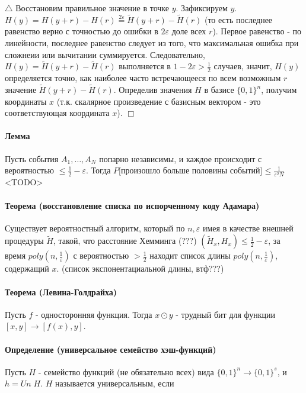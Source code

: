 \documentclass[12pt, a4paper]{article}
\newcommand{\uniform}{Un \;}
\newcommand{\bool}{\{0, 1\}}
\newcommand{\eps}{\varepsilon}
\begin{document}
$\triangle$ Восстановим правильное значение в точке $y$. Зафиксируем $y$. $H(y) = H(y + r) - H(r) \stackrel{2 \eps}{=} \widetilde{H}(y + r) - \widetilde{H}(r)$ (то есть последнее равенство верно с точностью до ошибки в $2 \eps$ доле всех $r$). Первое равенство - по линейности, последнее равенство следует из того, что максимальная ошибка при сложнеии или вычитании суммируется. Следовательно, $H(y) = \widetilde{H}(y + r) - \widetilde{H}(r)$ выполняется в $1 - 2\eps > \frac{1}{2}$ случаев, значит, $H(y)$ определяется точно, как наиболее часто встречающееся по всем возможным $r$ значение $\widetilde{H}(y + r) - \widetilde{H}(r)$. Определив значения $H$ в базисе $\bool^n$, получим координаты $x$ (т.к. скалярное произведение с базисным вектором - это соответствующая координата $x$).
$\Box$

\paragraph{Лемма} Пусть события $A_1, \dots, A_N$ попарно независимы, и каждое происходит с вероятностью $\leq \frac{1}{2} - \eps$. Тогда $P[$произошло больше половины событий$] \leq \frac{1}{\eps^2 N}$
<TODO>

\paragraph{Теорема (восстановление списка по испорченному коду Адамара)} Существует вероятностный алгоритм, который по $n, \eps$ имея в качестве внешней процедуры $\widetilde{H}$, такой, что расстояние Хемминга (???) $(\widetilde{H}_x, H_x) \leq \frac{1}{2} - \eps$, за время $poly(n, \frac{1}{\eps})$ с вероятностью $ > \frac{1}{2}$ находит список длины $poly(n, \frac{1}{\eps})$, содержащий $x$. (список экспонентациальной длины, втф???)

\paragraph{Теорема (Левина-Голдрайха)} Пусть $f$ - односторонняя функция. Тогда $x \odot y$ - трудный бит для функции $[x, y] \rightarrow [f(x), y]$.

\paragraph{Определение (универсальное семейство хэш-функций)} Пусть $H$ - семейство функций (не обязательно всех) вида $\bool^n \rightarrow \bool^s$, и $h = \uniform H$. $H$ называется универсальным, если
\end{document}
